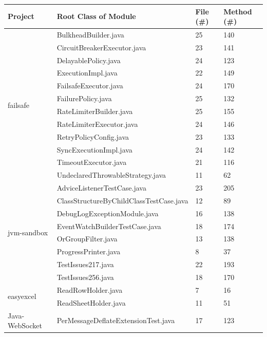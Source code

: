 \begin{table}[!t]
\centering
    \begin{tabular}{m{1.8cm}m{4.5cm}m{0.5cm}m{0.5cm}}
\toprule
 \textbf{Project}  & \textbf{Root Class of Module} & \textbf{File (\#)} & \textbf{Method (\#)} \\
\midrule
\multirow{12}{*}{failsafe} & BulkheadBuilder.java  & 25 & 140 \\
            & CircuitBreakerExecutor.java   & 23 & 141 \\
            & DelayablePolicy.java   & 24 & 123 \\
            & ExecutionImpl.java   & 22 & 149 \\
            & FailsafeExecutor.java   & 24 & 170 \\
            & FailurePolicy.java   & 25 & 132 \\
            & RateLimiterBuilder.java   & 25 & 155 \\
            & RateLimiterExecutor.java   & 24 & 146 \\
            & RetryPolicyConfig.java   & 23 & 133 \\
            & SyncExecutionImpl.java   & 24 & 142 \\
            & TimeoutExecutor.java   & 21 & 116 \\
            & UndeclaredThrowableStrategy.java   & 11 & 62 \\
\midrule
\multirow{8}{*}{jvm-sandbox} & AdviceListenerTestCase.java  & 23 & 205 \\
                            &ClassStructureByChildClassTestCase.java  & 12 & 89 \\
                            &DebugLogExceptionModule.java  & 16 & 138 \\
                            &EventWatchBuilderTestCase.java  & 18 & 174 \\
                            &OrGroupFilter.java  & 13 & 138 \\
                            &ProgressPrinter.java  & 8 & 37 \\
                            &TestIssues217.java  & 22 & 193 \\
                            &TestIssues256.java  & 18 & 170 \\
\midrule
\multirow{2}{*}{easyexcel} & ReadRowHolder.java  & 7 & 16 \\
                        & ReadSheetHolder.java  & 11 & 51 \\
\midrule
\multirow{2}{*}{Java-WebSocket} & PerMessageDeflateExtensionTest.java   & 17 & 123 \\

\end{tabular}
\end{table}
